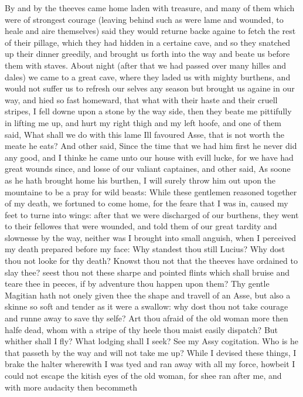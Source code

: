By and by the theeves came home laden with treasure, and many of them which
were of strongest courage (leaving behind such as were lame and wounded, to
heale and aire themselves) said they would returne backe againe to fetch the
rest of their pillage, which they had hidden in a certaine cave, and so they
snatched up their dinner greedily, and brought us forth into the way and beate
us before them with staves. About night (after that we had passed over many
hilles and dales) we came to a great cave, where they laded us with mighty
burthens, and would not suffer us to refresh our selves any season but brought
us againe in our way, and hied so fast homeward, that what with their haste and
their cruell stripes, I fell downe upon a stone by the way side, then they
beate me pittifully in lifting me up, and hurt my right thigh and my left
hoofe, and one of them said, What shall we do with this lame Ill favoured Asse,
that is not worth the meate he eats? And other said, Since the time that we had
him first he never did any good, and I thinke he came unto our house with evill
lucke, for we have had great wounds since, and losse of our valiant captaines,
and other said, As soone as he hath brought home his burthen, I will surely
throw him out upon the mountaine to be a pray for wild beasts: While these
gentlemen reasoned together of my death, we fortuned to come home, for the
feare that I was in, caused my feet to turne into wings: after that we were
discharged of our burthens, they went to their fellowes that were wounded, and
told them of our great tardity and slownesse by the way, neither was I brought
into small anguish, when I perceived my death prepared before my face: Why
standest thou still Lucius? Why dost thou not looke for thy death? Knowst thou
not that the theeves have ordained to slay thee? seest thou not these sharpe
and pointed flints which shall bruise and teare thee in peeces, if by adventure
thou happen upon them? Thy gentle Magitian hath not onely given thee the shape
and travell of an Asse, but also a skinne so soft and tender as it were a
swallow: why dost thou not take courage and runne away to save thy selfe? Art
thou afraid of the old woman more then halfe dead, whom with a stripe of thy
heele thou maist easily dispatch? But whither shall I fly? What lodging shall I
seek? See my Assy cogitation. Who is he that passeth by the way and will not
take me up? While I devised these things, I brake the halter wherewith I was
tyed and ran away with all my force, howbeit I could not escape the kitish eyes
of the old woman, for shee ran after me, and with more audacity then becommeth

